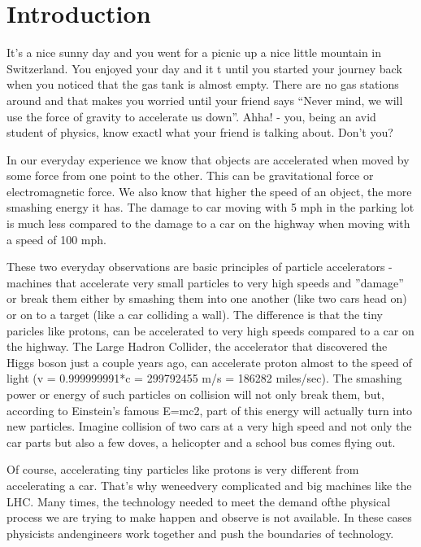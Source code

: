 \section{Introduction}

\noindent
It's  a nice sunny day and you went for a picnic up a nice little mountain in Switzerland. You enjoyed your day and it t until you started your journey back when you noticed that the gas tank is almost empty. There are no gas stations around and that makes you worried until your friend says ``Never mind, we will use the force of gravity to accelerate us down''. Ahha! - you, being an avid student of physics, know exactl what your friend is talking about. Don't you?

\;
\noindent
In our everyday experience we know that objects are accelerated when moved by some force from one point to the other. This can be gravitational force or electromagnetic force.
We also know that higher the speed of an object, the more smashing energy it has. The damage to car moving with 5 mph in the parking lot is much less compared to the damage to a car on the highway when moving with a speed of 100 mph.

\;
\noindent
These two everyday observations are basic principles of particle accelerators - machines that accelerate very small particles to very high speeds and ''damage'' or break them either by smashing them into one another (like two cars head on) or on to a target (like a car colliding a wall). The difference is that the tiny paricles like protons, can be accelerated to very high speeds compared to a car on the highway. The Large Hadron Collider, the accelerator that discovered the Higgs boson just a couple years ago, can accelerate proton almost to the speed of light (v = 0.999999991*c = 299792455 m/s = 186282 miles/sec). The smashing power or energy of such particles on collision will not only break them, but, according to Einstein's famous E=mc2, part of this energy will actually turn into new particles. Imagine collision of two cars at a very high speed and not only the car parts but also a few doves, a helicopter and a school bus comes flying out.

\;
\noindent
Of course, accelerating tiny particles like protons is very different from accelerating a car. That's why weneedvery complicated and big machines like the LHC. Many times, the technology needed to meet the demand ofthe physical process we are trying to make happen and observe is not available. In these cases physicists andengineers work together and push the boundaries of technology.

